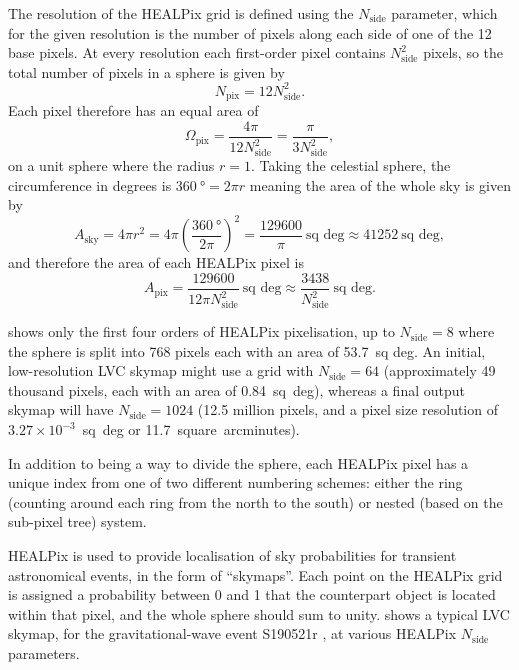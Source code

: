\begin{colsection}
The resolution of the HEALPix grid is defined using the $N_\text{side}$ parameter, which for the given resolution is the number of pixels along each side of one of the 12 base pixels. At every resolution each first-order pixel contains $N_\text{side}^2$ pixels, so the total number of pixels in a sphere is given by
%
\begin{equation}
    N_\text{pix} = 12 N_\text{side}^2.
    \label{eq:healpix_npix}
\end{equation}
%
Each pixel therefore has an equal area of
%
\begin{equation}
    \Omega_\text{pix} = \frac{4\pi}{12 N_\text{side}^2} = \frac{\pi}{3 N_\text{side}^2},
    \label{eq:healpix_area}
\end{equation}
%
on a unit sphere where the radius $r=1$. Taking the celestial sphere, the circumference in degrees is $\SI{360}{\degree} = 2 \pi r$ meaning the area of the whole sky is given by
%
\begin{equation}
    A_\text{sky} = 4 \pi r^2 = 4 \pi \left ( \frac{\SI{360}{\degree}}{2 \pi} \right )^2 = \frac{129600}{\pi}~\text{sq deg} \approx 41252~\text{sq deg} , %
    \label{eq:sky_area}
\end{equation}
%
and therefore the area of each HEALPix pixel is
%
\begin{equation}
    A_\text{pix} = \frac{129600}{12 \pi N_\text{side}^2}~\text{sq~deg} \approx \frac{3438}{N_\text{side}^2}~\text{sq~deg}.
    \label{eq:healpix_area_degrees}
\end{equation}

 shows only the first four orders of HEALPix pixelisation, up to $N_\text{side} = 8$ where the sphere is split into 768 pixels each with an area of 53.7~sq deg. An initial, low-resolution LVC skymap might use a grid with $N_\text{side} = 64$ (approximately 49 thousand pixels, each with an area of 0.84~sq~deg), whereas a final output skymap will have $N_\text{side} = 1024$ (12.5 million pixels, and a pixel size resolution of $3.27 \times 10^{-3}$~sq~deg or 11.7~square~arcminutes).

In addition to being a way to divide the sphere, each HEALPix pixel has a unique index from one of two different numbering schemes: either the ring (counting around each ring from the north to the south) or nested (based on the sub-pixel tree) system.

HEALPix is used to provide localisation of sky probabilities for transient astronomical events, in the form of ``skymaps''. Each point on the HEALPix grid is assigned a probability between 0 and 1 that the counterpart object is located within that pixel, and the whole sphere should sum to unity.  shows a typical LVC skymap, for the gravitational-wave event S190521r \citep{S190521r}, at various HEALPix $N_\text{side}$ parameters.


\end{colsection}
